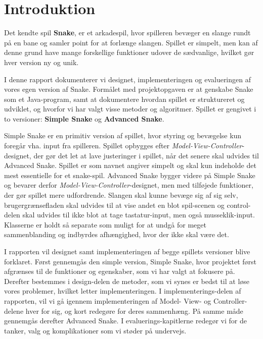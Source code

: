\chapter{Introduktion}

Det kendte spil \textbf{Snake}, er et arkadespil, hvor spilleren bevæger en slange rundt på en bane og samler point for at forlænge slangen. Spillet er simpelt, men kan af denne grund have mange forskellige funktioner udover de sædvanlige, hvilket gør hver version ny og unik.
\newline

I denne rapport dokumenterer vi designet, implementeringen og evalueringen af vores egen version af Snake. Formålet med projektopgaven er at genskabe Snake som et Java-program, samt at dokumentere hvordan spillet er struktureret og udviklet, og hvorfor vi har valgt visse metoder og algoritmer.
Spillet er gengivet i to versioner: \textbf{Simple Snake} og \textbf{Advanced Snake}.
\newline

Simple Snake er en primitiv version af spillet, hvor styring og bevægelse kun foregår vha. input fra spilleren. Spillet opbygges efter \textit{Model-View-Controller}-designet, der gør det let at lave justeringer i spillet, når det senere skal udvides til Advanced Snake. Spillet er som navnet angiver simpelt og skal kun indeholde det mest essentielle for et snake-spil. Advanced Snake bygger videre på Simple Snake og bevarer derfor \textit{Model-View-Controller}-designet, men med tilføjede funktioner, der gør spillet mere udfordrende. Slangen skal kunne bevæge sig af sig selv, brugergrænsefladen skal udvides til at vise andet en blot spil-scenen og control-delen skal udvides til ikke blot at tage tastatur-input, men også musseklik-input. Klasserne er holdt så separate som muligt for at undgå for meget sammenblanding og indbyrdes afhængighed, hvor der ikke skal være det.
\newline

I rapporten vil designet samt implementeringen af begge spillets versioner blive forklaret. Først gennemgås den simple version, Simple Snake, hvor projektet først afgrænses til de funktioner og egenskaber, som vi har valgt at fokusere på. Derefter bestemmes i design-delen de metoder, som vi synes er bedst til at løse vores problemer, hvilket letter implementeringen. I implementerings-delen af rapporten, vil vi gå igennem implementeringen af Model- View- og Controller-delene hver for sig, og kort redegøre for deres sammenhæng. På samme måde gennemgås derefter Advanced Snake. I evaluerings-kapitlerne redegør vi for de tanker, valg og komplikationer som vi støder på undervejs. 

